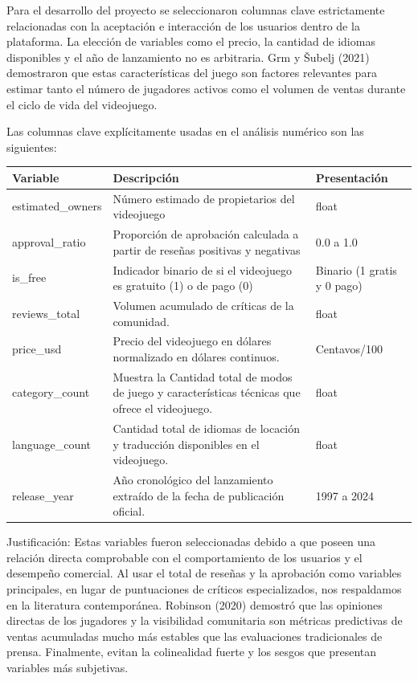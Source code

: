 \documentclass[12pt]{report}
\begin{document}
Para el desarrollo del proyecto se seleccionaron columnas clave estrictamente relacionadas con la aceptación e interacción de los usuarios dentro de la plataforma. La elección de variables como el precio, la cantidad de idiomas disponibles y el año de lanzamiento no es arbitraria. Grm y Šubelj (2021)\cite{grm2021predicting} demostraron que estas características del juego son factores relevantes para estimar tanto el número de jugadores activos como el volumen de ventas durante el ciclo de vida del videojuego.

Las columnas clave explícitamente usadas en el análisis numérico son las siguientes:

\begin{table}[h]
\centering
\begin{tabular}{|p{3cm}|p{8cm}|p{3cm}|}
\hline
\textbf{Variable} & \textbf{Descripción} & \textbf{Presentación} \\ \hline
estimated\_owners & Número estimado de propietarios del videojuego & float \\ \hline
approval\_ratio & Proporción de aprobación calculada a partir de reseñas positivas y negativas & 0.0 a 1.0 \\ \hline
is\_free & Indicador binario de si el videojuego es gratuito (1) o de pago (0) & Binario (1 gratis y 0 pago) \\ \hline
reviews\_total & Volumen acumulado de críticas de la comunidad. & float \\ \hline
price\_usd & Precio del videojuego en dólares normalizado en dólares continuos. & Centavos/100 \\ \hline
category\_count & Muestra la Cantidad total de modos de juego y características técnicas que ofrece el videojuego. & float \\ \hline
language\_count & Cantidad total de idiomas de locación y traducción disponibles en el videojuego. & float \\ \hline
release\_year & Año cronológico del lanzamiento extraído de la fecha de publicación oficial. & 1997 a 2024 \\ \hline
\end{tabular}
\end{table}

Justificación: Estas variables fueron seleccionadas debido a que poseen una relación directa comprobable con el comportamiento de los usuarios y el desempeño comercial. Al usar el total de reseñas y la aprobación como variables principales, en lugar de puntuaciones de críticos especializados, nos respaldamos en la literatura contemporánea. Robinson (2020)\cite{robinson2020predicting} demostró que las opiniones directas de los jugadores y la visibilidad comunitaria son métricas predictivas de ventas acumuladas mucho más estables que las evaluaciones tradicionales de prensa. Finalmente, evitan la colinealidad fuerte y los sesgos que presentan variables más subjetivas.
\end{document}
